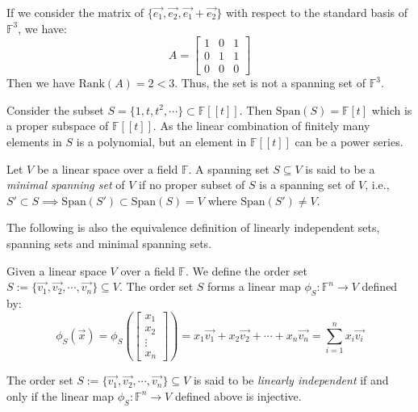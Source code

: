 \documentclass[
	11pt, %
	fleqn, %
	a4paper, %
]{LegrandOrangeBook}
\renewcommand{\span}[1]{\text{Span}(#1)} %
\newcommand{\F}{\mathbb{F}} %
\newcommand{\rank}[1]{\text{Rank}(#1)} %
\begin{document}
\begin{remark}
    If we consider the matrix of $\{\vec{e_1}, \vec{e_2}, \vec{e_1} + \vec{e_2}\}$ with respect to the standard basis of $\F^3$, we have:
    \[
        A = \begin{bmatrix}
            1 & 0 & 1 \\
            0 & 1 & 1 \\
            0 & 0 & 0
        \end{bmatrix}
    \]
    Then we have $\rank{A} = 2 < 3$. Thus, the set is not a spanning set of $\F^3$.
\end{remark}

\begin{example}
    Consider the subset $S = \{ 1, t, t^2, \cdots \} \subset \F[[t]]$. Then $\span{S} = \F[t]$ which is a proper subspace of $\F[[t]]$. As the linear combination of finitely many elements in $S$ is a polynomial, but an element in $\F[[t]]$ can be a power series.
\end{example}

\begin{definition}
    Let $V$ be a linear space over a field $\F$. A spanning set $S \subseteq V$ is said to be a \emph{minimal spanning set} of $V$ if no proper subset of $S$ is a spanning set of $V$, i.e., $S' \subset S \implies \span{S'} \subset \span{S} = V$ where $\span{S'} \neq V$.
\end{definition}

The following is also the equivalence definition of linearly independent sets, spanning sets and minimal spanning sets.

Given a linear space $V$ over a field $\F$. We define the order set $S := \{\vec{v_1}, \vec{v_2}, \cdots, \vec{v_n}\} \subseteq V$. The order set $S$ forms a linear map $\phi_S: \F^n \to V$ defined by:
\[
    \phi_S(\vec{x}) = \phi_S\left(\begin{bmatrix}
        x_1 \\
        x_2 \\
        \vdots \\
        x_n
    \end{bmatrix}\right) = x_1 \vec{v_1} + x_2 \vec{v_2} + \cdots + x_n \vec{v_n} = \sum_{i=1}^{n} x_i \vec{v_i}
\]

\begin{proposition}
    The order set $S := \{\vec{v_1}, \vec{v_2}, \cdots, \vec{v_n}\} \subseteq V$ is said to be \emph{linearly independent} if and only if the linear map $\phi_S: \F^n \to V$ defined above is injective.
\end{proposition}
\end{document}
